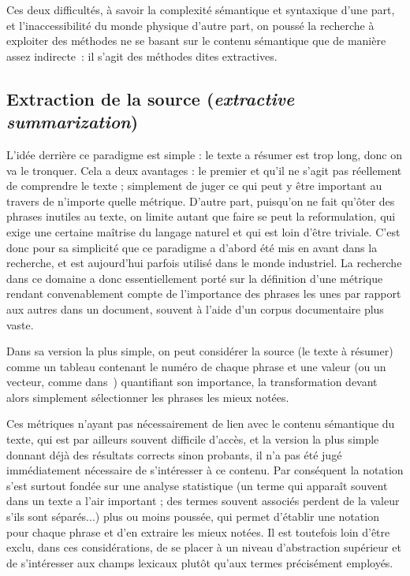 \documentclass[a4paper, 12pt]{article}
\begin{document}
Ces deux difficultés, à savoir la complexité sémantique et syntaxique d'une part, et l'inaccessibilité du monde physique d'autre part, on poussé la recherche à exploiter des méthodes ne se basant sur le contenu sémantique que de manière assez indirecte~: il s'agit des méthodes dites extractives.


\subsection{Extraction de la source (\emph{extractive summarization})}

L'idée derrière ce paradigme est simple : le texte a résumer est trop long, donc on va le tronquer. Cela a deux avantages : le premier et qu'il ne s'agit pas réellement de comprendre le texte ; simplement de juger ce qui peut y être important au travers de n'importe quelle métrique. D'autre part, puisqu'on ne fait qu'ôter des phrases inutiles au texte, on limite autant que faire se peut la reformulation, qui exige une certaine maîtrise du langage naturel et qui est loin d'être triviale. C'est donc pour sa simplicité que ce paradigme a d'abord été mis en avant dans la recherche, et est aujourd'hui parfois utilisé dans le monde industriel. La recherche dans ce domaine a donc essentiellement porté sur la définition d'une métrique rendant convenablement compte de l'importance des phrases les unes par rapport aux autres dans un document, souvent à l'aide d'un corpus documentaire plus vaste.

Dans sa version la plus simple, on peut considérer la source (le texte à résumer) comme un tableau contenant le numéro de chaque phrase et une valeur (ou un vecteur, comme dans~\cite{fattah_ga_2009}) quantifiant son importance, la transformation devant alors simplement sélectionner les phrases les mieux notées. 

Ces métriques n'ayant pas nécessairement de lien avec le contenu sémantique du texte, qui est par ailleurs souvent difficile d'accès, et la version la plus simple donnant déjà des résultats corrects sinon probants, il n'a pas été jugé immédiatement nécessaire de s'intéresser à ce contenu. Par conséquent la notation s'est surtout fondée sur une analyse statistique (un terme qui apparaît souvent dans un texte a l'air important ; des termes souvent associés perdent de la valeur s'ils sont séparés...) plus ou moins poussée, qui permet d'établir une notation pour chaque phrase et d'en extraire les mieux notées. Il est toutefois loin d'être exclu, dans ces considérations, de se placer à un niveau d'abstraction supérieur et de s'intéresser aux champs lexicaux plutôt qu'aux termes précisément employés.
\end{document}
